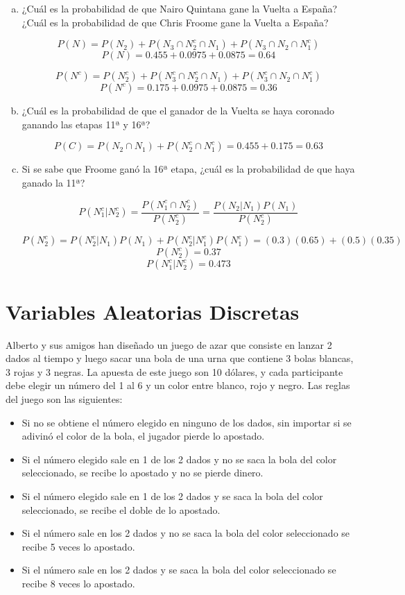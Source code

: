 \documentclass[11pt, spanish]{article}
\begin{document}
\begin{enumerate}[(a)]
\item ¿Cuál es la probabilidad de que Nairo Quintana gane la Vuelta a España? ¿Cuál es
la probabilidad de que Chris Froome gane la Vuelta a España?

$$P(N) = P(N_2) + P(N_3 \cap N_2^c \cap N_1) + P(N_3 \cap N_2 \cap N_1^c)$$
$$P(N) = 0.455 + 0.0975 + 0.0875 = 0.64$$

$$P(N^c) = P(N_2^c) + P(N_3^c \cap N_2^c \cap N_1) + P(N_3^c \cap N_2 \cap N_1^c)$$
$$P(N^c) = 0.175 + 0.0975 + 0.0875 = 0.36$$


\item ¿Cuál es la probabilidad de que el ganador de la Vuelta se haya coronado ganando
las etapas 11ª y 16ª?

$$P(C) = P(N_2 \cap N_1) + P(N_2^c \cap N_1^c) = 0.455 + 0.175 = 0.63$$

\item Si se sabe que Froome ganó la 16ª etapa, ¿cuál es la probabilidad de que haya
ganado la 11ª?

$$P(N_1^c | N_2^c) = \frac{P(N_1^c \cap N_2^c)}{P(N_2^c)} = \frac{P(N_2 | N_1)P(N_1)}{P(N_2^c)}$$

$$P(N_2^c) = P(N_2^c | N_1)P(N_1) + P(N_2^c | N_1^c)P(N_1^c) = (0.3)(0.65) + (0.5)(0.35)$$
$$P(N_2^c) = 0.37$$
$$P(N_1^c | N_2^c) = 0.473$$

\end{enumerate}

\section{Variables Aleatorias Discretas}

Alberto y sus amigos han diseñado un juego de azar que consiste en lanzar 2 dados al tiempo y
luego sacar una bola de una urna que contiene 3 bolas blancas, 3 rojas y 3 negras. La apuesta de este juego son 10 dólares, y cada participante debe elegir un número del 1 al 6 y un color entre blanco, rojo y negro. Las reglas del juego son las siguientes:

\begin{itemize}
\item Si no se obtiene el número elegido en ninguno de los dados, sin importar si se adivinó el
color de la bola, el jugador pierde lo apostado.

\item Si el número elegido sale en 1 de los 2 dados y no se saca la bola del color seleccionado,
se recibe lo apostado y no se pierde dinero.

\item Si el número elegido sale en 1 de los 2 dados y se saca la bola del color seleccionado, se
recibe el doble de lo apostado.

\item Si el número sale en los 2 dados y no se saca la bola del color seleccionado se recibe 5
veces lo apostado.

\item Si el número sale en los 2 dados y se saca la bola del color seleccionado se recibe 8 veces
lo apostado.
\end{itemize}
\end{document}
